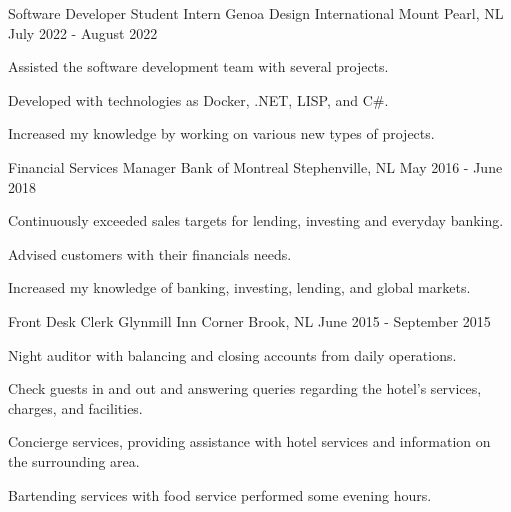 

\begin{cventries}

  \cventry
    {Software Developer Student Intern} %
    {Genoa Design International} %
    {Mount Pearl, NL} %
    {July 2022 - August 2022} %
    {
      \begin{cvitems} %
        \item {Assisted the software development team with several projects.}
        \item {Developed with technologies as Docker, .NET, LISP, and C\#.}
        \item {Increased my knowledge by working on various new types of projects.}
      \end{cvitems}
    }

  \cventry
    {Financial Services Manager} %
    {Bank of Montreal} %
    {Stephenville, NL} %
    {May 2016 - June 2018} %
    {
      \begin{cvitems} %
        \item {Continuously exceeded sales targets for lending, investing and everyday banking.}
        \item {Advised customers with their financials needs.}
        \item {Increased my knowledge of banking, investing, lending, and global markets.}
      \end{cvitems}
    }

  \cventry
    {Front Desk Clerk} %
    {Glynmill Inn} %
    {Corner Brook, NL} %
    {June 2015 - September 2015} %
    {
      \begin{cvitems} %
        \item {Night auditor with balancing and closing accounts from daily operations.}
        \item {Check guests in and out and answering queries regarding the hotel's services, charges, and facilities.}
        \item {Concierge services, providing assistance with hotel services and information on the surrounding area.}
		\item {Bartending services with food service performed some evening hours.}
      \end{cvitems}
    }


\end{cventries}
